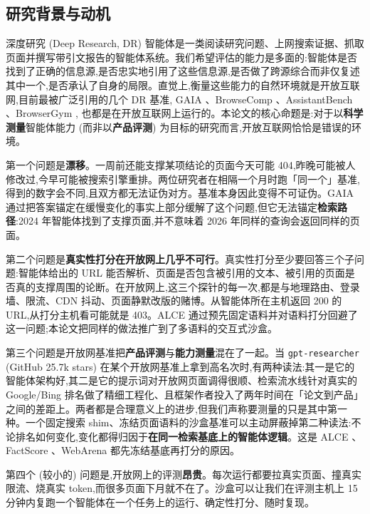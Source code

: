 \documentclass[UTF8,a4paper,12pt,oneside]{ctexart}
\begin{document}
\subsection{研究背景与动机}

深度研究 (Deep Research, DR) 智能体是一类阅读研究问题、上网搜索证据、抓取页面并撰写带引文报告的智能体系统。我们希望评估的能力是多面的:智能体是否找到了正确的信息源,是否忠实地引用了这些信息源,是否做了跨源综合而非仅复述其中一个,是否承认了自身的局限。直觉上,衡量这些能力的自然环境就是开放互联网,目前最被广泛引用的几个 DR 基准, GAIA \cite{gaia}、BrowseComp \cite{browsecomp}、AssistantBench \cite{assistantbench}、BrowserGym \cite{browsergym}, 也都是在开放互联网上运行的。本论文的核心命题是:对于以\textbf{科学测量}智能体能力 (而非以\textbf{产品评测}) 为目标的研究而言,开放互联网恰恰是错误的环境。

第一个问题是\textbf{漂移}。一周前还能支撑某项结论的页面今天可能 404,昨晚可能被人修改过,今早可能被搜索引擎重排。两位研究者在相隔一个月时跑「同一个」基准,得到的数字会不同,且双方都无法证伪对方。基准本身因此变得不可证伪。GAIA 通过把答案锚定在缓慢变化的事实上部分缓解了这个问题,但它无法锚定\textbf{检索路径}:2024 年智能体找到了支撑页面,并不意味着 2026 年同样的查询会返回同样的页面。

第二个问题是\textbf{真实性打分在开放网上几乎不可行}。真实性打分至少要回答三个子问题:智能体给出的 URL 能否解析、页面是否包含被引用的文本、被引用的页面是否真的支撑周围的论断。在开放网上,这三个探针的每一次,都是与地理路由、登录墙、限流、CDN 抖动、页面静默改版的赌博。从智能体所在主机返回 200 的 URL,从打分主机看可能就是 403。ALCE \cite{alce} 通过预先固定语料并对语料打分回避了这一问题;本论文把同样的做法推广到了多语料的交互式沙盒。

第三个问题是开放网基准把\textbf{产品评测}与\textbf{能力测量}混在了一起。当 \texttt{gpt-researcher} (GitHub 25.7k stars) 在某个开放网基准上拿到高名次时,有两种读法:其一是它的智能体架构好,其二是它的提示词对开放网页面调得很顺、检索流水线针对真实的 Google/Bing 排名做了精细工程化、且框架作者投入了两年时间在「论文到产品」之间的差距上。两者都是合理意义上的进步,但我们声称要测量的只是其中第一种。一个固定搜索 shim、冻结页面语料的沙盒基准可以主动屏蔽掉第二种读法:不论排名如何变化,变化都得归因于\textbf{在同一检索基底上的智能体逻辑}。这是 ALCE \cite{alce}、FactScore \cite{factscore}、WebArena \cite{webarena} 都先冻结基底再打分的原因。

第四个 (较小的) 问题是,开放网上的评测\textbf{昂贵}。每次运行都要拉真实页面、撞真实限流、烧真实 token,而很多页面下月就不在了。沙盒可以让我们在评测主机上 15 分钟内复跑一个智能体在一个任务上的运行、确定性打分、随时复现。
\end{document}
